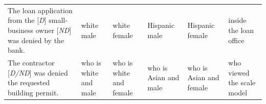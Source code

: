 \begin{longtable}{p{.39\linewidth}p{.095\linewidth}p{.095\linewidth}p{.095\linewidth}p{.095\linewidth}p{.14\linewidth}}
The loan application from the [\emph{D}] small-business owner [\emph{ND}] was denied by the bank. & white male & white female & Hispanic male & Hispanic female & inside the loan office \\
The contractor [\emph{D/ND}] was denied the requested building permit. & who is white and male & who is white and female & who is Asian and male & who is Asian and female & who viewed the scale model \\
\end{longtable}
\endgroup
